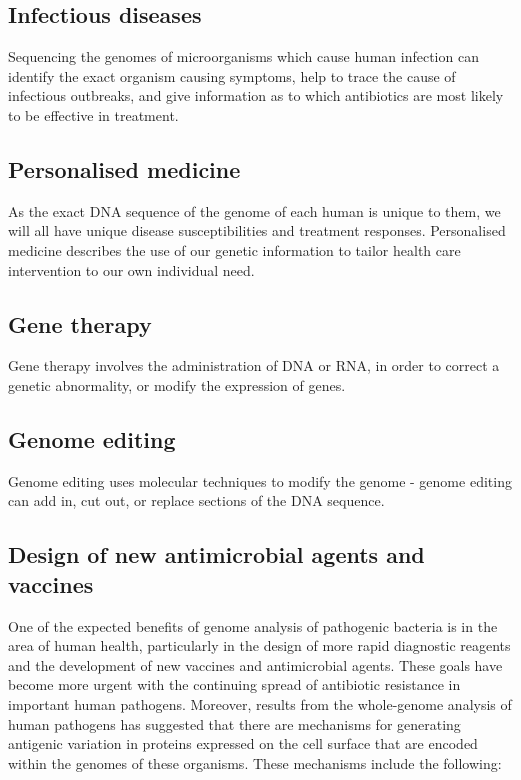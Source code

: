 \subsection{Infectious diseases} 
Sequencing the genomes of microorganisms which cause human infection can identify the exact organism causing symptoms, help to trace the cause of infectious outbreaks, and give information as to which antibiotics are most likely to be effective in treatment.


\subsection{Personalised medicine}
As the exact DNA sequence of the genome of each human is unique to them, we will all have unique disease susceptibilities and treatment responses. Personalised medicine describes the use of our genetic information to tailor health care intervention to our own individual need.

\subsection{Gene therapy}
Gene therapy involves the administration of DNA or RNA, in order to correct a genetic abnormality, or modify the expression of genes.

\subsection{Genome editing}
Genome editing uses molecular techniques to modify the genome - genome editing can add in, cut out, or replace sections of the DNA sequence.

\subsection{Design of new antimicrobial agents and vaccines}
One of the expected benefits of genome analysis of pathogenic bacteria is in the area of human health, particularly in the design of more rapid diagnostic reagents and the development of new vaccines and antimicrobial agents. These goals have become more urgent with the continuing spread of antibiotic resistance in important human pathogens. Moreover, results from the whole-genome analysis of human pathogens has suggested that there are mechanisms for generating antigenic variation in proteins expressed on the cell surface that are encoded within the genomes of these organisms\cite{fraser2000microbial}.
These mechanisms include the following:


